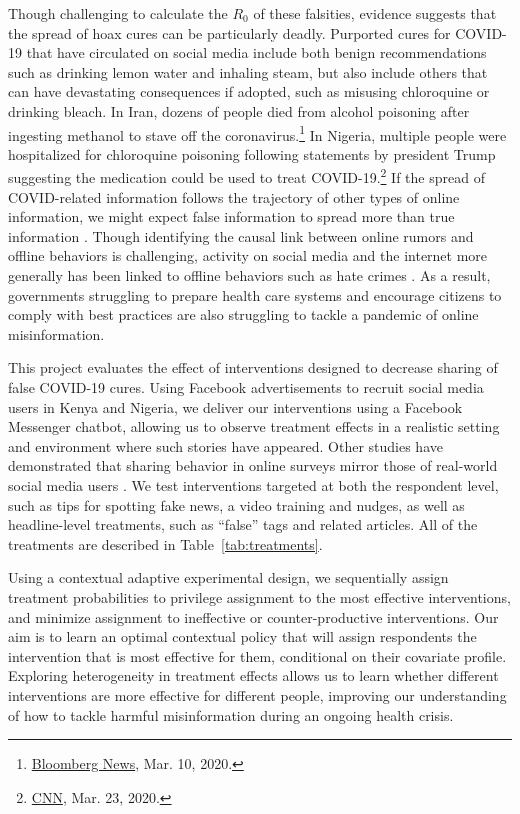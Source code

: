 \documentclass[letterpaper, 12pt, parskip=full,]{scrartcl}
\begin{document}
Though challenging to calculate the $R_0$ of these falsities, evidence suggests that the spread of hoax cures can be particularly deadly. Purported cures for COVID-19 that have circulated on social media include both benign recommendations such as drinking lemon water and inhaling steam, but also include others that can have devastating consequences if adopted, such as misusing chloroquine or drinking bleach. In Iran, dozens of people died from alcohol poisoning after ingesting methanol to stave off the coronavirus.\footnote{\href{https://nationalpost.com/news/world/rumours-that-alcohol-kills-covid-19-leaves-21-iranians-dead-from-poisoning}{Bloomberg News}, Mar. 10, 2020.} In Nigeria, multiple people were hospitalized for chloroquine poisoning following statements by president Trump suggesting the medication could be used to treat COVID-19.\footnote{\href{https://www.cnn.com/2020/03/23/africa/chloroquine-trump-nigeria-intl/index.html}{CNN}, Mar. 23, 2020.} If the spread of COVID-related information follows the trajectory of other types of online information, we might expect false information to spread more than true information \citep{vosoughi2018spread}. Though identifying the causal link between online rumors and offline behaviors is challenging, activity on social media and the internet more generally has been linked to offline behaviors such as hate crimes \citep{muller2019fanning, chan2016internet}. As a result, governments struggling to prepare health care systems and encourage citizens to comply with best practices are also struggling to tackle a pandemic of online misinformation.

This project evaluates the effect of interventions designed to decrease sharing of false COVID-19 cures. Using Facebook advertisements to recruit social media users in Kenya and Nigeria, we deliver our interventions using a Facebook Messenger chatbot, allowing us to observe treatment effects in a realistic setting and environment where such stories have appeared. Other studies have demonstrated that sharing behavior in online surveys mirror those of real-world social media users \citep{mosleh2020self}. We test interventions targeted at both the respondent level, such as tips for spotting fake news, a video training and nudges, as well as headline-level treatments, such as ``false'' tags and related articles. All of the treatments are described in Table~\ref{tab:treatments}. 

Using a contextual adaptive experimental design, we sequentially assign treatment probabilities to privilege assignment to the most effective interventions, and minimize assignment to ineffective or counter-productive interventions. Our aim is to learn an optimal contextual policy that will assign respondents the intervention that is most effective for them, conditional on their covariate profile. Exploring heterogeneity in treatment effects allows us to learn whether different interventions are more effective for different people, improving our understanding of how to tackle harmful misinformation during an ongoing health crisis. 
\end{document}
